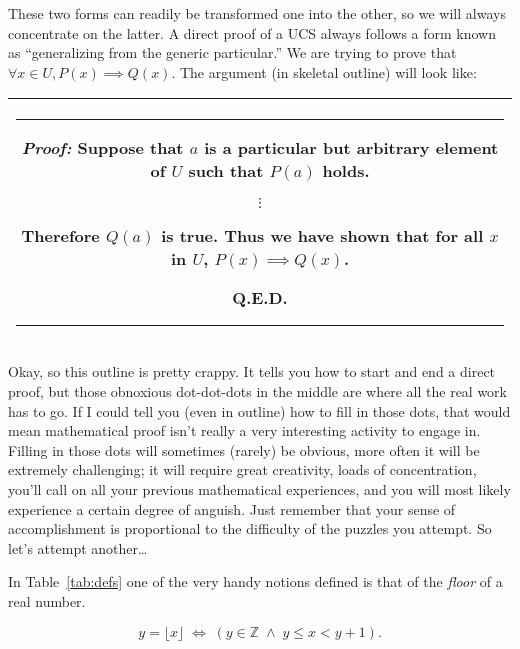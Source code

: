These two forms can readily be transformed one into the other, so 
we will always concentrate on the latter.  A direct proof of a UCS
always follows a form known as 
``generalizing from the generic particular.''
We are trying to prove that $\forall x \in U, P(x) \implies Q(x)$.  
The argument (in skeletal outline) will look like:
\medskip

\begin{center}
\begin{tabular}{|c|} \hline
\rule{16pt}{0pt}\begin{minipage}{.75\textwidth}
\rule{0pt}{20pt} {\em Proof:} Suppose that $a$ is a particular but arbitrary element of $U$ such 
that $P(a)$ holds.

\begin{center}
$\vdots$
\end{center}

Therefore $Q(a)$ is true. \newline
Thus we have shown that for all $x$ in $U$, $P(x) \implies Q(x)$.\newline
\rule{0pt}{0pt} \hspace{\fill} Q.E.D. \rule[-10pt]{0pt}{16pt}
\end{minipage} \rule{16pt}{0pt} \\ \hline
\end{tabular}
\end{center}
\medskip

Okay, so this outline is pretty crappy.  It tells you how to start and 
end a direct proof, but those obnoxious dot-dot-dots in the middle are 
where all the real work has to go.  If I could tell you (even in outline) 
how to fill in those dots, that would mean mathematical proof isn't really 
a very interesting activity to engage in.  Filling in those dots will 
sometimes (rarely) be obvious, more often it will be extremely challenging; 
it will require great creativity, loads of concentration, you'll call on 
all your previous mathematical experiences, and you will most likely
experience a certain degree of anguish.  Just remember that your sense 
of accomplishment is proportional to the difficulty of the puzzles you 
attempt.  So let's attempt another\ldots

In Table~\ref{tab:defs} one of the very handy notions defined is that 
of the \emph{floor} of a real number. 

\[ y = \lfloor x \rfloor \; \iff \; (y \in \mathbb Z \; \land \; y \leq x < y+1).\]

